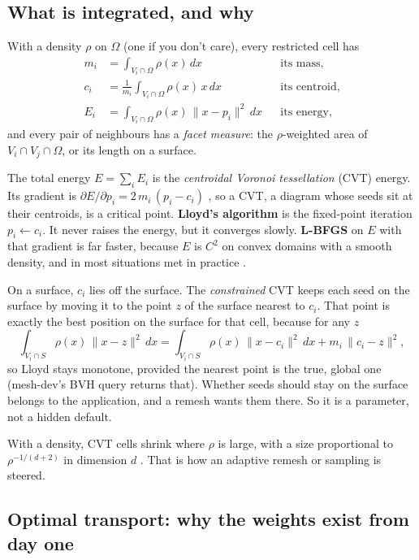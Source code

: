 \documentclass[11pt,a4paper]{article}
\newcommand{\norm}[1]{\lVert #1\rVert}
\begin{document}
\subsection{What is integrated, and why}\label{ssec:integrals}

With a density $\rho$ on $\Omega$ (one if you don't care), every restricted cell has
\begin{align*}
  m_i &= \int_{V_i\cap\Omega} \rho(x)\,dx                         && \text{its mass,}\\
  c_i &= \frac{1}{m_i}\int_{V_i\cap\Omega} \rho(x)\,x\,dx         && \text{its centroid,}\\
  E_i &= \int_{V_i\cap\Omega} \rho(x)\,\norm{x - p_i}^2\,dx       && \text{its energy,}
\end{align*}
and every pair of neighbours has a \emph{facet measure}: the $\rho$-weighted area of
$V_i \cap V_j \cap \Omega$, or its length on a surface.

The total energy $E = \sum_i E_i$ is the \emph{centroidal Voronoi tessellation} (CVT) energy.
Its gradient is $\partial E/\partial p_i = 2\,m_i\,(p_i - c_i)$ \citep{du1999}, so a CVT, a
diagram whose seeds sit at their centroids, is a critical point. \textbf{Lloyd's algorithm} is
the fixed-point iteration $p_i \leftarrow c_i$. It never raises the energy, but it converges
slowly. \textbf{L-BFGS} on $E$ with that gradient is far faster, because $E$ is $C^2$ on convex
domains with a smooth density, and in most situations met in practice \citep{liu2009}.

On a surface, $c_i$ lies off the surface. The \emph{constrained} CVT \citep{du2003} keeps each
seed on the surface by moving it to the point $z$ of the surface nearest to $c_i$. That point is
exactly the best position on the surface for that cell, because for any $z$
\[
  \int_{V_i\cap S} \rho(x)\,\norm{x - z}^2\,dx
  = \int_{V_i\cap S} \rho(x)\,\norm{x - c_i}^2\,dx + m_i\,\norm{c_i - z}^2 ,
\]
so Lloyd stays monotone, provided the nearest point is the true, global one (mesh-dev's BVH
query returns that). Whether seeds should stay on the surface belongs to the application, and a
remesh wants them there. So it is a parameter, not a hidden default.

With a density, CVT cells shrink where $\rho$ is large, with a size proportional to
$\rho^{-1/(d+2)}$ in dimension $d$ \citep{du1999}. That is how an adaptive remesh or sampling is
steered.

\subsection{Optimal transport: why the weights exist from day one}\label{ssec:ot}
\end{document}

